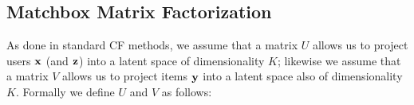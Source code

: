 \begin{comment}
\subsection{Probabilistic Matrix Factorization}


Probabilistic Matrix Factorization tries to model the user preference matrix as a product of 2 lower-rank user and item matrices. The predicted rating of user $i$ on movie $j$ is $U_i^TV_j$. Additionally, $\lambda$ is the regularization parameter and $I_{ij}$ is an indicator function that is equal to 1 if user $i$ rated movie $j$ and equal to 0 otherwise. PMF minimizes the following error function:

\[
E = \frac{1}{2} \sum_{i=1}^N \sum_{j=1}^M \mathbf I_{ij} {(\mathbf R_{ij}-\mathbf U_i^T \mathbf V_j)^2} 
+ \frac{\lambda}{2} \sum _{i=1}^N ||\mathbf U_i||^2_{Fro}
+ \frac{\lambda}{2} \sum _{j=1}^M ||\mathbf V_j||^2_{Fro}
\]


\begin{align}
\sum_{(\x,\y) \in D} \frac{1}{2} (R_{\x,\y} - [\sigma] U^T V)^2
\end{align}
\end{comment}

\subsection{Matchbox Matrix Factorization}

\begin{comment}
One weakness of PMF is that it has a hard time making predictions for users that have made very few or no ratings, and for movies that have been given few or no ratings. To fix this, we can incorporate the user and movie features into the matrix factorization to help bootstrap predictions. Incorporating user and movie features also improve predictions even for users and movies that have had lots of ratings. The objective function of Matchbox Matrix Factorization with Features that is being minimized is
\end{comment}

\begin{comment}
\[
E = \frac{1}{2} \sum_{i=1}^N \sum_{j=1}^M \mathbf I_{ij} {(\mathbf R_{ij}-\mathbf{s}^T \mathbf{t})^2} 
+ \frac{\lambda}{2} ||\mathbf U_i||^2_{Fro}
+ \frac{\lambda}{2} ||\mathbf V_j||^2_{Fro}
\]
\end{comment}

As done in standard CF methods, we assume that
a matrix $U$ allows us to project users $\mathbf{x}$ (and $\mathbf{z}$)
into a latent space of dimensionality $K$; likewise we assume that
a matrix $V$ allows us to project items $\mathbf{y}$ into a latent
space also of dimensionality $K$.  Formally we define $U$ and $V$
as follows:

